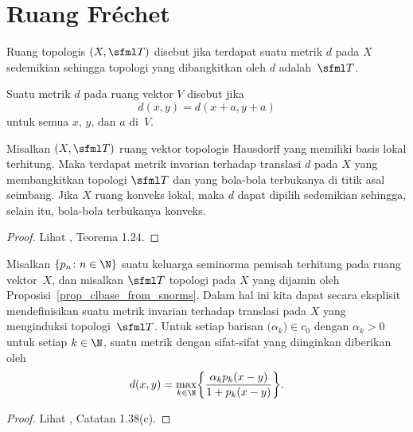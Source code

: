 \section{Ruang Fr\'echet}

\begin{defn} Ruang topologis $(X,\sfml T)$ disebut
 jika terdapat suatu metrik $d$ pada $X$ sedemikian sehingga topologi yang dibangkitkan oleh $d$ adalah~$\sfml T$.
\end{defn}

\begin{defn} Suatu metrik $d$ pada ruang vektor $V$ disebut
 jika
   \[ d(x,y) = d(x + a, y + a) \]
untuk semua $x$, $y$, dan $a$ di~$V$.
\end{defn}

\begin{prop} Misalkan $(X,\sfml T)$ ruang vektor topologis Hausdorff yang memiliki basis lokal terhitung. Maka terdapat metrik
invarian terhadap translasi $d$ pada $X$ yang membangkitkan topologi $\sfml T$ dan yang bola-bola terbukanya di titik asal seimbang. Jika $X$ ruang konveks lokal,
maka $d$ dapat dipilih sedemikian sehingga, selain itu, bola-bola terbukanya konveks.
\end{prop}

\begin{proof} Lihat \cite{Rudin:1991}, Teorema 1.24.  \ns
\end{proof}

\begin{exam}\label{X_metric_from_seminorms} Misalkan $\{p_n\colon n \in \N\}$ suatu keluarga seminorma pemisah terhitung pada ruang
vektor~$X$, dan misalkan $\sfml T$ topologi pada $X$ yang dijamin oleh Proposisi~\ref{prop_clbase_from_snorms}. Dalam hal ini kita dapat secara eksplisit
mendefinisikan suatu metrik invarian terhadap translasi pada $X$ yang menginduksi topologi~$\sfml T$. Untuk setiap barisan $\bigl(\alpha_k\bigr) \in c_0$
dengan $\alpha_k>0$ untuk setiap $k\in\N$, suatu metrik dengan sifat-sifat yang diinginkan diberikan oleh
   \[ d(x,y) = \max_{k \in \N}\biggl\{\frac{\alpha_k p_k(x-y)}{1 + p_k(x-y)}\biggr\}. \]
\end{exam}

\begin{proof} Lihat \cite{Rudin:1991}, Catatan 1.38(c).  \ns
\end{proof}

